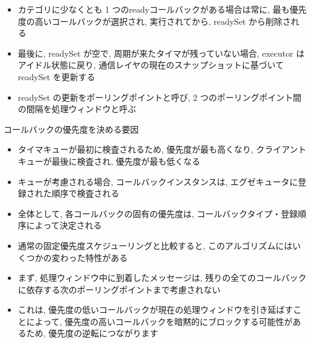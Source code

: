 \begin{frame}{}
    \begin{itemize}
        \item カテゴリに少なくとも 1 つのreadyコールバックがある場合は常に, 最も優先度の高いコールバックが選択され, 実行されてから, readySet から削除される
        \item 最後に, readySet が空で, 周期が来たタイマが残っていない場合, executor はアイドル状態に戻り, 通信レイヤの現在のスナップショットに基づいて readySet を更新する
        \item readySet の更新をポーリングポイントと呼び, 2 つのポーリングポイント間の間隔を処理ウィンドウと呼ぶ
    \end{itemize}
\end{frame}

\begin{frame}{コールバックの優先度を決める要因}
    \begin{itemize}
        \item タイマキューが最初に検査されるため, 優先度が最も高くなり, クライアントキューが最後に検査され, 優先度が最も低くなる
        \item キューが考慮される場合, コールバックインスタンスは, エグゼキュータに登録された順序で検査される
        \item 全体として, 各コールバックの固有の優先度は, コールバックタイプ・登録順序によって決定される
    \end{itemize}
\end{frame}

\begin{frame}{}
    \begin{itemize}
        \item 通常の固定優先度スケジューリングと比較すると, このアルゴリズムにはいくつかの変わった特性がある
        \item まず, 処理ウィンドウ中に到着したメッセージは, 残りの全てのコールバックに依存する次のポーリングポイントまで考慮されない
        \item これは, 優先度の低いコールバックが現在の処理ウィンドウを引き延ばすことによって, 優先度の高いコールバックを暗黙的にブロックする可能性があるため, 優先度の逆転につながります
    \end{itemize}
\end{frame}

